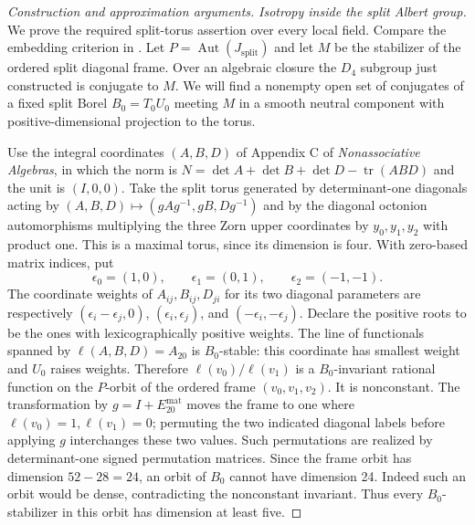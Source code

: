 \documentclass[11pt,a4paper,openany,oneside]{book}
\theoremstyle{resultstyle}
\theoremstyle{definition}
\numberwithin{equation}{chapter}
\begin{document}
\begin{proof}[Construction and approximation arguments]
\emph{Isotropy inside the split Albert group.}
We prove the required split-torus assertion over every local
field. Compare the embedding criterion in
\cite[Proposition 2.1]{alsaodyf4}. Let \(P=\operatorname{Aut}(J_{\mathrm{split}})\) and let \(M\)
be the stabilizer of the ordered split diagonal frame. Over an algebraic
closure the \(D_4\) subgroup just constructed is conjugate to \(M\).
We will find a nonempty open set of conjugates of a fixed split Borel
\(B_0=T_0U_0\) meeting \(M\) in a smooth neutral component with
positive-dimensional projection to the torus.

Use the integral coordinates \((A,B,D)\) of Appendix C of
\emph{Nonassociative Algebras}, in which the norm is
\(N=\det A+\det B+\det D-\operatorname{tr}(ABD)\) and the unit is
\((I,0,0)\). Take the split torus generated by determinant-one
diagonals acting by \((A,B,D)\mapsto(gAg^{-1},gB,Dg^{-1})\)
and by the diagonal octonion automorphisms multiplying the three
Zorn upper coordinates by \(y_0,y_1,y_2\) with product one.
This is a maximal torus, since its dimension is four.
With zero-based matrix indices, put
\[
 \epsilon_0=(1,0),\qquad \epsilon_1=(0,1),\qquad
 \epsilon_2=(-1,-1).
\]
The coordinate weights of \(A_{ij},B_{ij},D_{ji}\) for its
two diagonal parameters are respectively
\((\epsilon_i-\epsilon_j,0)\), \((\epsilon_i,\epsilon_j)\),
and \((-\epsilon_i,-\epsilon_j)\). Declare the positive roots
to be the ones with lexicographically positive weights.
The line of functionals spanned by \(\ell(A,B,D)=A_{20}\)
is \(B_0\)-stable: this coordinate has smallest weight and
\(U_0\) raises weights. Therefore
\(\ell(v_0)/\ell(v_1)\) is a \(B_0\)-invariant rational function
on the \(P\)-orbit of the ordered frame \((v_0,v_1,v_2)\).
It is nonconstant. The transformation by \(g=I+E^{\mathrm{mat}}_{20}\)
moves the frame to one where \(\ell(v_0)=1,\ell(v_1)=0\);
permuting the two indicated diagonal labels before applying \(g\)
interchanges these two values. Such permutations are realized
by determinant-one signed permutation matrices. Since the frame
orbit has dimension \(52-28=24\), an orbit of \(B_0\) cannot
have dimension 24. Indeed such an orbit would be dense, contradicting
the nonconstant invariant. Thus every \(B_0\)-stabilizer in this
orbit has dimension at least five.


\end{proof}
\end{document}
